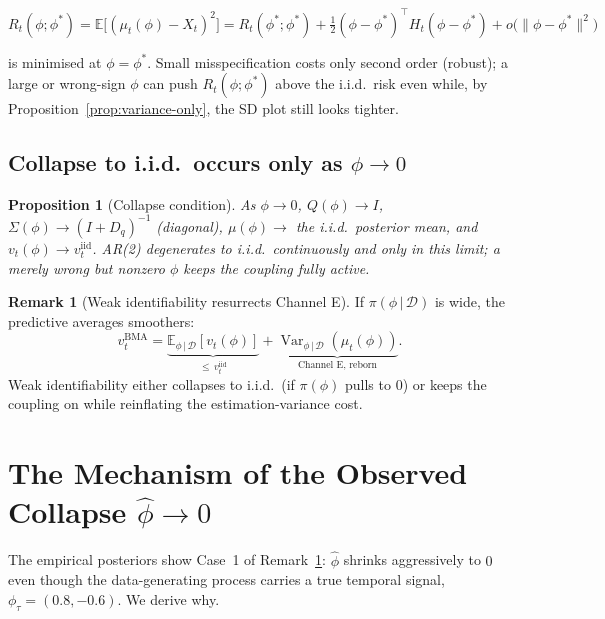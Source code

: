 \documentclass[11pt]{article}
\newtheorem{proposition}{Proposition}
\theoremstyle{definition}
\newtheorem{remark}{Remark}
\newcommand{\E}{\mathbb{E}}
\newcommand{\Var}{\operatorname{Var}}
\newcommand{\D}{\mathcal{D}}
\newcommand{\given}{\,\vert\,}
\begin{document}
\begin{equation}
  R_t(\phi; \phi^\ast)
    = \E\big[(\mu_t(\phi) - X_t)^2\big]
    = R_t(\phi^\ast; \phi^\ast)
    + \tfrac12 (\phi - \phi^\ast)^\top H_t (\phi - \phi^\ast)
    + o\big(\|\phi - \phi^\ast\|^2\big)
  \label{eq:risk-expansion}
\end{equation}

is minimised at $\phi = \phi^\ast$. Small misspecification costs only
second order (robust); a large or wrong-sign $\phi$ can push
$R_t(\phi;\phi^\ast)$ above the i.i.d.\ risk even while, by
Proposition~\ref{prop:variance-only}, the SD plot still looks tighter.

\subsection{Collapse to i.i.d.\ occurs only as $\phi \to 0$}

\begin{proposition}[Collapse condition]
\label{prop:collapse}
As $\phi \to 0$, $Q(\phi) \to I$, $\Sigma(\phi) \to (I + D_q)^{-1}$
(diagonal), $\mu(\phi) \to$ the i.i.d.\ posterior mean, and
$v_t(\phi) \to v_t^{\mathrm{iid}}$. AR(2) degenerates to i.i.d.\
\emph{continuously and only} in this limit; a merely wrong but nonzero
$\phi$ keeps the coupling fully active.
\end{proposition}

\begin{remark}[Weak identifiability resurrects Channel E]
\label{rem:bma}
If $\pi(\phi \given \D)$ is wide, the predictive averages smoothers:
\begin{equation}
  v_t^{\mathrm{BMA}}
    = \underbrace{\E_{\phi \given \D}[v_t(\phi)]}
        _{\le\, v_t^{\mathrm{iid}}}
    + \underbrace{\Var_{\phi \given \D}(\mu_t(\phi))}
        _{\text{Channel E, reborn}}.
  \label{eq:bma}
\end{equation}
Weak identifiability either collapses to i.i.d.\ (if $\pi(\phi)$ pulls
to $0$) or keeps the coupling on while reinflating the
estimation-variance cost.
\end{remark}

\section{The Mechanism of the Observed Collapse $\hat\phi \to 0$}
\label{sec:identifiability}

The empirical posteriors show Case~1 of Remark~\ref{rem:bma}:
$\hat\phi$ shrinks aggressively to $0$ even though the data-generating
process carries a true temporal signal,
$\phi_\tau = (0.8, -0.6)$. We derive why.
\end{document}
